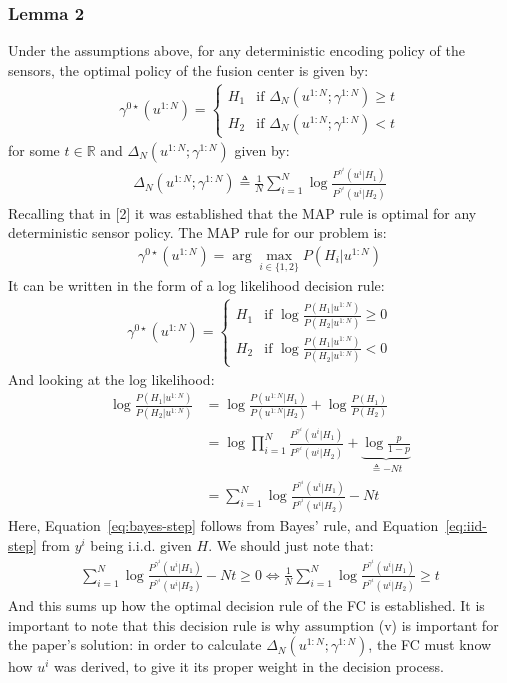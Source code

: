 \documentclass[11pt]{article}
\newcommand{\DN}{\Delta_N(u^{1:N};\gamma^{1:N})}
\begin{document}
\subsubsection*{Lemma 2}
Under the assumptions above, for any deterministic encoding policy of the sensors, the optimal policy of the fusion center is given by:
\begin{align}
    \gamma^{0\star}(u^{1:N}) =                         
        \begin{cases}
            H_1 & \text{if }    \Delta_N(u^{1:N};\gamma^{1:N}) \geq t \\
            H_2 & \text{if }      \Delta_N(u^{1:N};\gamma^{1:N}) < t
        \end{cases}
\end{align}
for some $t \in \mathbb{R}$ and $\DN$ given by:
\begin{align}
    \DN \triangleq \frac{1}{N}\sum_{i=1}^{N}\log \frac{P^{\gamma^i}(u^i|H_1)}{P^{\gamma^i}(u^i|H_2)}
\end{align}
Recalling that in [2] it was established that the MAP rule is optimal for any deterministic sensor policy.
The MAP rule for our problem is:
\begin{align}
    \gamma^{0\star}(u^{1:N}) = \arg\max_{i \in \{1,2\}}P(H_i|u^{1:N})
\end{align}
It can be written in the form of a log likelihood decision rule:
\begin{align}
    \gamma^{0\star}(u^{1:N}) =
    \begin{cases}
        H_1 & \text{if }        \log \frac{P(H_1|u^{1:N})}{P(H_2|u^{1:N})} \geq 0\\
        H_2 & \text{if }        \log \frac{P(H_1|u^{1:N})}{P(H_2|u^{1:N})} < 0
    \end{cases}
\end{align}
And looking at the log likelihood:
\begin{align}
    \log \frac{P(H_1|u^{1:N})}{P(H_2|u^{1:N})} &= \log \frac{P(u^{1:N}|H_1)}{P(u^{1:N}|H_2)} + \log\frac{P(H_1)}{P(H_2)} \label{eq:bayes-step}\\
    &= \log \prod _{i = 1}^{N} \frac{P^{\gamma^i}(u^i|H_1)}{P^{\gamma^i}(u^i|H_2)} + \underbrace{\log\frac{p}{1-p}}_{\triangleq -Nt} \label{eq:iid-step}\\
    &= \sum_{i=1}^{N}\log\frac{P^{\gamma^i}(u^i|H_1)}{P^{\gamma^i}(u^i|H_2)} - Nt
\end{align}
Here, Equation~\eqref{eq:bayes-step} follows from Bayes' rule, and Equation~\eqref{eq:iid-step} from $y^i$ being i.i.d. given $H$. We should just note that:
\begin{align}
    \sum_{i=1}^{N}\log\frac{P^{\gamma^i}(u^i|H_1)}{P^{\gamma^i}(u^i|H_2)} - Nt \geq 0 \iff \frac{1}{N}\sum_{i=1}^{N}\log\frac{P^{\gamma^i}(u^i|H_1)}{P^{\gamma^i}(u^i|H_2)} \geq t
\end{align}
And this sums up how the optimal decision rule of the FC is established. It is important to note that this decision rule is why assumption (v) is important for the paper's solution:
in order to calculate $\DN$, the FC must know how $u^i$ was derived, to give it its proper weight in the decision process.
\end{document}
